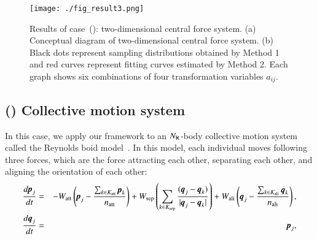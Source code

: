 \documentclass[preprint,
bibnotes,
 amsmath,amssymb,
 aps,
]{revtex4-1}
\newcounter{num}
\newcommand{\rnum}[1]{\setcounter{num}{#1}\roman{num}}
\begin{document}
\begin{figure}[tp]
  \begin{center}
   \texttt{[image: ./fig\_result3.png]}
  \caption{Results of case~(\rnum{3}): two-dimensional central force system. (a) Conceptual diagram of two-dimensional central force system. 
(b) Black dots represent sampling distributions obtained by Method 1 and red curves represent fitting curves estimated by Method 2. Each graph shows six combinations of four transformation variables $a_{ij}$.}
  \label{fig_result3}
  \end{center}
\end{figure}

\subsection*{(\rnum{4}) Collective motion system}
In this case, we apply our framework to an $N_{\rm R}$-body collective motion system called the Reynolds boid model~\cite{reynolds1987flocks}. In this model, each individual moves following three forces, which are the force attracting each other, separating each other, and aligning the orientation of each other:
\begin{eqnarray}
\label{eqd}
\frac{d {\textit{\textbf{p}}}_j}{d t} &=&  -W_{\rm att}\left({\textit{\textbf{p}}}_j  - \frac{\sum_{k\in K_{\rm att}}{\textit{\textbf{p}}}_k}{n_{\rm att}}\right) + W_{\rm sep}\left(\sum_{k\in K_{\rm sep}}\frac{({\textit{\textbf{q}}}_j - {\textit{\textbf{q}}}_k)}{|{\textit{\textbf{q}}}_j - {\textit{\textbf{q}}}_k|}\right) + W_{\rm ali}\left({\textit{\textbf{q}}}_j - \frac{\sum_{k\in K_{\rm ali}}{\textit{\textbf{q}}}_k}{n_{\rm ali}}\right),\\
\frac{d {\textit{\textbf{q}}}_j}{d t} &=& {\textit{\textbf{p}}}_j,
\end{eqnarray}
\end{document}
